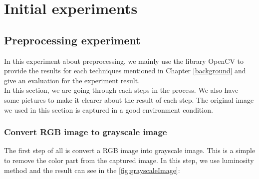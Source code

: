 \chapter{Initial experiments}\label{chap:exp}

\section{Preprocessing experiment}
In this experiment about preprocessing, we mainly use the library OpenCV to provide the results for each techniques mentioned in Chapter \ref{background} and give an evaluation for the experiment result. \\
In this section, we are going through each steps in the process. We also have some pictures to make it clearer about the result of each step. The original image we used in this section is captured in a good environment condition.
\subsection{Convert RGB image to grayscale image}
The first step of all is convert a RGB image into grayscale image. This is a simple to remove the color part from the captured image. In this step, we use luminosity method and the result can see in the \ref{fig:grayscaleImage}:

